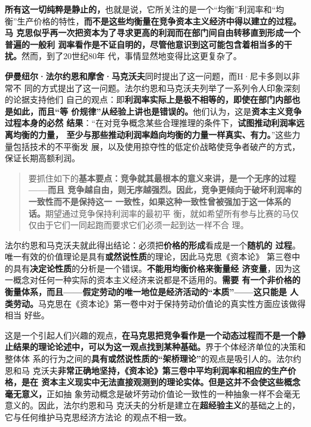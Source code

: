 \textbf{所有这一切纯粹是静止的，}也就是说，它所关注的是一个“均衡”利润率和“均
衡”生产价格的特性，\textbf{而不是这些均衡量在竞争资本主义经济中得以建立的过程。马
克思似乎再一次把资本为了寻求更高的利润而在部门间自由转移直到形成一个普遍的一般利
润率看作是不证自明的，尽管他意识到这可能包含着相当多的干扰。}然而，到了20世纪80年
代，事情显然地变得比这更复杂了。

\textbf{伊曼纽尔·法尔约恩和摩舍·马克沃夫}同时提出了这一问题，而H·尼卡多则以非常不
同的方式提出了这一问题。法尔约恩和马克沃夫列举了一系列令人印象深刻的论据支持他们
自己的观点：即\textbf{利润率实际上是极不相等的，即使在部门内部也是如此，而且“等
  价规律”从经验上讲也是错误的。}他们认为，这是\textbf{资本主义竞争过程本身的必然
  结果}：“在对竞争概念某些合理推理的条件下，\textbf{试图推动利润率远离均衡的力量，
  至少与那些推动利润率趋向均衡的力量一样真实、有力。}”这些力量包括技术的不平衡发
展，以及使用掠夺性的低定价战略使竞争者破产的方式，保证长期高额利润。
\begin{quotation}
  要抓住如下的\textbf{基本要点：竞争就其最根本的意义来讲，是一个无序的过程——而且
    竞争越自由，则无序越强烈。因此，竞争更倾向于破坏利润率的一致性而不是保持这一
    一致性，如果这种一致性曾被强加于这一体系的话。}期望通过竞争保持利润率的最初平
  衡，就如希望所有参与比赛的马仅仅由于它们一同起跑而要求它们必须一起到达一样不合
  理。
\end{quotation}

法尔约恩和马克沃夫就此得出结论：必须把\textbf{价格的形成}看成是一个\textbf{随机的
  过程}。唯一有效的价值理论是具有\textbf{或然说性质}的理论，因此马克思《资本论》
第三卷中的具有\textbf{决定论性质}的分析是一个错误。\textbf{不能用均衡价格来衡量经
  济变量}，因为这一概念对任何一种实际的资本主义经济来说都是不适用的。\textbf{需要
  有一个非价格的衡量体系，而且——假定劳动的唯一地位是经济活动的“本质”——这只能是
  人类劳动。}马克思在《资本论》第一卷中对于保持劳动价值论的真实性方面应该做得相当
好些。

这是一个引起人们兴趣的观点，\textbf{在马克思把竞争看作是一个动态过程而不是一个静
  止结果的理论论述中，可以为这一观点找到某种基础。}界于个体经济单位的决策和整体体
系的行为之间的\textbf{具有或然说性质的“架桥理论”}的观点是吸引人的。法尔约恩和马
克沃夫\textbf{非常正确地坚持，《资本论》第三卷中平均利润率和相应的生产价格，是在
  资本主义现实中无法直接观测到的理论实体。但是这并不会使这些概念毫无意义，}正如抽
象劳动概念是破坏劳动价值论一致性的一种抽象一样不会毫无意义的。因此，法尔约恩和马
克沃夫的分析是建立在\textbf{超经验主义}的基础之上的，它与任何维护马克思经济方法论
的观点不相一致。

